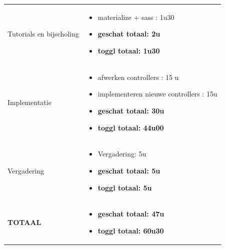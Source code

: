 \documentclass{article}
\begin{document}
\begin{center}
\begin{tabularx}{\textwidth}[t]{XX}
\vspace{1 mm}
Tutorials en bijscholing & 
\begin{minipage}[t]{\linewidth}%
\vspace{1 mm}
\begin{itemize}
\item materialize + sass  : 1u30
\item \textbf{geschat totaal: 2u}
\item \textbf{toggl totaal: 1u30}
\end{itemize} 
\vspace{1 mm}
\end{minipage}\\

\arrayrulecolor{black}\hline


\vspace{1 mm}
Implementatie & 
\begin{minipage}[t]{\linewidth}%
\vspace{1 mm}
\begin{itemize}
\item afwerken controllers : 15 u
\item implementeren nieuwe controllers : 15u
\item \textbf{geschat totaal: 30u}
\item \textbf{toggl totaal: 44u00}
\end{itemize} 
\vspace{1 mm}
\end{minipage}\\


\arrayrulecolor{black}\hline

\vspace{2 mm}
Vergadering & 
\begin{minipage}[t]{\linewidth}%
\vspace{2 mm}
\begin{itemize}
\item Vergadering: 5u
\item \textbf{geschat totaal: 5u}
\item \textbf{toggl totaal: 5u}
\vspace{2 mm}
\end{itemize} 
\end{minipage}\\

\arrayrulecolor{black}\hline

\vspace{2 mm}
\textbf{TOTAAL} & 
\begin{minipage}[t]{\linewidth}%
\vspace{2 mm}
\begin{itemize}
\item \textbf{geschat totaal: 47u}
\item \textbf{toggl totaal: 60u30}
\vspace{2 mm}
\end{itemize} 
\end{minipage}\\
\end{tabularx}
\end{center}
\end{document}
